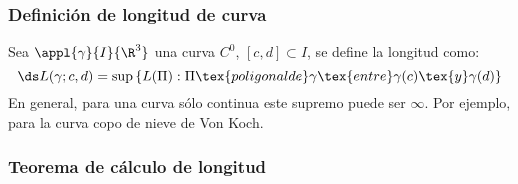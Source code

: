 \documentclass[12pt]{article}
\begin{document}
\subsubsection{Definición de longitud de curva}
\begin{defn}
	Sea $\appl{\gamma}{I}{\R^3}$ una curva $C^0$, $\left[c,d\right] \subset  I$, se define la longitud como: \[\ds L(\gamma; c, d)=\sup \left\{L(\Pi) : \Pi\tex{ poligonal de } \gamma \tex{ entre }\gamma(c)\tex{ y }\gamma(d)\right\}\]
	En general, para una curva sólo continua este supremo puede ser $\infty$. Por ejemplo, para la curva copo de nieve de Von Koch.
\end{defn}

\subsubsection{Teorema de cálculo de longitud}
\end{document}
